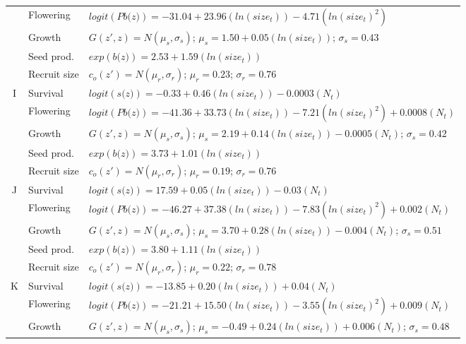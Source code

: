 \documentclass[12pt, letterpaper]{article}
\begin{document}
\begin{spacing}{1.3}
\begin{longtable}[ht]{c|l|p{}}
         \rowcolor[gray]{.95}& Flowering  & $logit(\textit{Pb(z)})  = -31.04 + 23.96(ln(size_t)) -4.71 (ln(size_t)^2)$ \\
         & Growth  &  $G(z',z) = N(\mu_s, \sigma_s)$; $\mu_s = 1.50 + 0.05(ln(size_t))$; $\sigma_s = 0.43$\\
        \rowcolor[gray]{.95} & Seed prod.  & $exp(\textit{b(z)}) = 2.53 + 1.59 (ln(size_t))$  \\
         & Recruit size  &  $c_o(z') = N(\mu_r, \sigma_r)$; $\mu_r = 0.23$; $\sigma_r = 0.76$ \\
         \hline
        \rowcolor[gray]{.95}I &  Survival  &  $logit(\textit{s(z)})= -0.33 +0.46(ln(size_t)) - 0.0003 (N_t)$ \\
         & Flowering  & $logit(\textit{Pb(z)})  = -41.36 + 33.73(ln(size_t)) -7.21 (ln(size_t)^2) + 0.0008(N_t)$ \\
         \rowcolor[gray]{.95}& Growth  &  $G(z',z) = N(\mu_s, \sigma_s)$; $\mu_s = 2.19 + 0.14(ln(size_t)) - 0.0005(N_t)$; $\sigma_s = 0.42$\\
         & Seed prod.  & $exp(\textit{b(z)}) = 3.73 + 1.01(ln(size_t))$  \\
         \rowcolor[gray]{.95}& Recruit size  &  $c_o(z') = N(\mu_r, \sigma_r)$; $\mu_r = 0.19$; $\sigma_r = 0.76$ \\
         \hline
         J &  Survival  &  $logit(\textit{s(z)})= 17.59 +0.05(ln(size_t)) - 0.03 (N_t)$ \\
         \rowcolor[gray]{.95}& Flowering  & $logit(\textit{Pb(z)})  = -46.27 + 37.38(ln(size_t)) -7.83 (ln(size_t)^2) + 0.002(N_t)$ \\
         & Growth  &  $G(z',z) = N(\mu_s, \sigma_s)$; $\mu_s = 3.70 + 0.28(ln(size_t)) - 0.004(N_t)$; $\sigma_s = 0.51$\\
         \rowcolor[gray]{.95}& Seed prod.  & $exp(\textit{b(z)}) = 3.80 + 1.11(ln(size_t))$  \\
         & Recruit size  &  $c_o(z') = N(\mu_r, \sigma_r)$; $\mu_r = 0.22$; $\sigma_r = 0.78$ \\
         \hline
         K\rowcolor[gray]{.95} &  Survival  &  $logit(\textit{s(z)})= -13.85 +0.20(ln(size_t)) + 0.04(N_t)$ \\
         & Flowering  & $logit(\textit{Pb(z)})  = -21.21 + 15.50(ln(size_t)) -3.55(ln(size_t)^2) + 0.009(N_t)$ \\
         \rowcolor[gray]{.95}& Growth  &  $G(z',z) = N(\mu_s, \sigma_s)$; $\mu_s = -0.49 + 0.24(ln(size_t)) + 0.006(N_t)$; $\sigma_s = 0.48$\\

\end{longtable}
\end{spacing}
\end{document}
